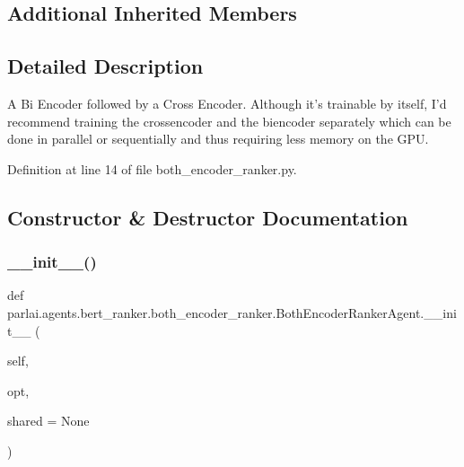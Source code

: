 \subsection*{Additional Inherited Members}


\subsection{Detailed Description}
\begin{DoxyVerb}A Bi Encoder followed by a Cross Encoder.
    Although it's trainable by itself, I'd recommend training the crossencoder
    and the biencoder separately which can be done in parallel or sequentially
    and thus requiring less memory on the GPU.
\end{DoxyVerb}
 

Definition at line 14 of file both\+\_\+encoder\+\_\+ranker.\+py.



\subsection{Constructor \& Destructor Documentation}
\mbox{\label{classparlai_1_1agents_1_1bert__ranker_1_1both__encoder__ranker_1_1BothEncoderRankerAgent_a96d864d610277625195f71a615c0f585}} 
\subsubsection{\texorpdfstring{\+\_\+\+\_\+init\+\_\+\+\_\+()}{\_\_init\_\_()}}
{\footnotesize\ttfamily def parlai.\+agents.\+bert\+\_\+ranker.\+both\+\_\+encoder\+\_\+ranker.\+Both\+Encoder\+Ranker\+Agent.\+\_\+\+\_\+init\+\_\+\+\_\+ (\begin{DoxyParamCaption}\item[{}]{self,  }\item[{}]{opt,  }\item[{}]{shared = {\ttfamily None} }\end{DoxyParamCaption})}



